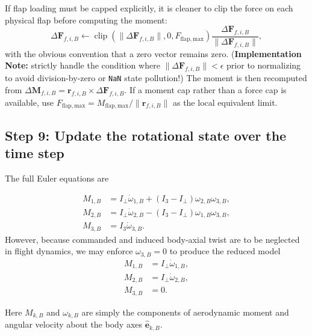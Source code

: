 If flap loading must be capped explicitly, it is cleaner to clip the force on each physical flap before computing the moment:
\begin{equation}
\Delta\mathbf F_{f,i,B}
\leftarrow
\operatorname{clip}
\!\left(
\|\Delta\mathbf F_{f,i,B}\|,
0,
F_{\mathrm{flap,max}}
\right)
\frac{\Delta\mathbf F_{f,i,B}}
{\|\Delta\mathbf F_{f,i,B}\|}, \label{eq:flap_clipping}
\end{equation}
with the obvious convention that a zero vector remains zero. (\textbf{Implementation Note:} strictly handle the condition where \(\|\Delta\mathbf F_{f,i,B}\| < \epsilon\) prior to normalizing to avoid division-by-zero or \texttt{NaN} state pollution!) The moment is then recomputed from \(\Delta\mathbf M_{f,i,B}=\mathbf r_{f,i,B}\times \Delta\mathbf F_{f,i,B}\). If a moment cap rather than a force cap is available, use \(F_{\mathrm{flap,max}}=M_{\mathrm{flap,max}}/\|\mathbf r_{f,i,B}\|\) as the local equivalent limit.

\subsection{Step 9: Update the rotational state over the time step}
The full Euler equations are

\begin{align}
M_{1,B} &= I_\perp \dot{\omega}_{1,B} + (I_3-I_\perp)\omega_{2,B}\omega_{3,B},\\
M_{2,B} &= I_\perp \dot{\omega}_{2,B} - (I_3-I_\perp)\omega_{1,B}\omega_{3,B},\\
M_{3,B} &= I_3 \dot{\omega}_{3,B}.
\end{align}
However, because commanded and induced body-axial twist are to be neglected in flight dynamics, we may enforce \(\omega_{3,B}=0\) to produce the reduced model
\begin{align}
M_{1,B} &= I_\perp \dot{\omega}_{1,B},\\
M_{2,B} &= I_\perp \dot{\omega}_{2,B},\\
M_{3,B} &= 0.
\end{align}

Here \(M_{k,B}\) and \(\omega_{k,B}\) are simply the components of aerodynamic moment and angular velocity about the body axes \(\hat{\mathbf e}_{k,B}\). 

